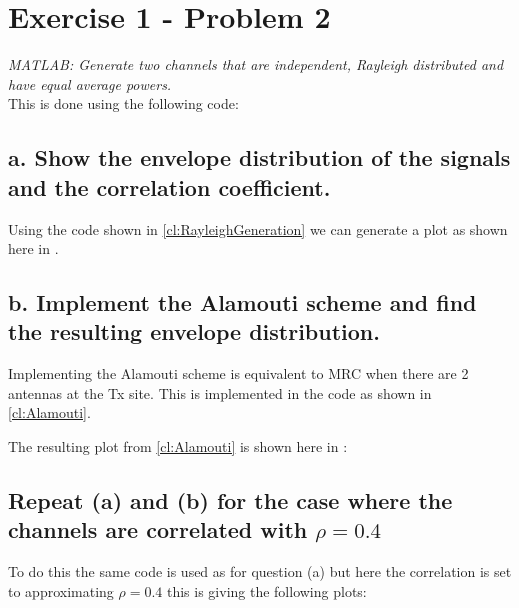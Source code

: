\section{Exercise 1 - Problem 2}
\textit{MATLAB: Generate two channels that are independent, Rayleigh distributed and have equal average powers.}\\

This is done using the following code:

\FloatBarrier %
\subsection{a. Show the envelope distribution of the signals and the correlation coefficient.}
Using the code shown in \cref{cl:RayleighGeneration} we can generate a plot as shown here in .


\FloatBarrier %
\subsection{b. Implement the Alamouti scheme and find the resulting envelope distribution.}
Implementing the Alamouti scheme is equivalent to MRC when there are 2 antennas at the Tx site. This is implemented in the code as shown in \cref{cl:Alamouti}.

The resulting plot from \cref{cl:Alamouti} is shown here in :

\FloatBarrier %
\subsection{Repeat (a) and (b) for the case where the channels are correlated with $\rho=0.4$ }
To do this the same code is used as for question (a) but here the correlation is set to approximating $\rho=0.4$ this is giving the following plots:

